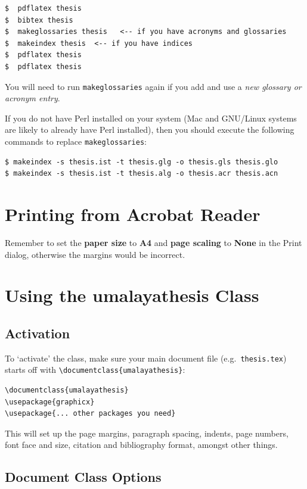 \begin{lstlisting}
$  pdflatex thesis
$  bibtex thesis
$  makeglossaries thesis   <-- if you have acronyms and glossaries
$  makeindex thesis  <-- if you have indices
$  pdflatex thesis
$  pdflatex thesis
\end{lstlisting}

You will need to run \texttt{makeglossaries} again if you add and use a \emph{new glossary or acronym entry}.

If you do not have Perl installed on your system (Mac and GNU/Linux systems are likely to already have Perl installed), then you should execute the following commands to replace \texttt{makeglossaries}:

\begin{lstlisting}
$ makeindex -s thesis.ist -t thesis.glg -o thesis.gls thesis.glo
$ makeindex -s thesis.ist -t thesis.alg -o thesis.acr thesis.acn
\end{lstlisting}

\section{Printing from Acrobat Reader}
Remember to set the \textbf{paper size} to \textbf{A4} and \textbf{page scaling} to \textbf{None} in the \textsf{Print} dialog, otherwise the margins would be incorrect.


\section{Using the umalayathesis Class}\label{sec:howto}

\subsection{Activation}\label{sec:activation}
To `activate' the class, make sure your main document file (e.g.\ \texttt{thesis.tex}) starts off with \verb|\documentclass{umalayathesis}|:

\begin{lstlisting}
\documentclass{umalayathesis}
\usepackage{graphicx}
\usepackage{... other packages you need}
\end{lstlisting}


This will set up the page margins, paragraph spacing, indents, page numbers, font face and size, citation and bibliography format, amongst other things.

\subsection{Document Class Options}

